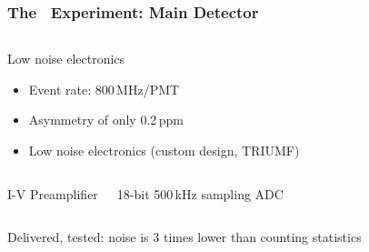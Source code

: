\begin{frame}
 \frametitle{The \Qweak\ Experiment: Main Detector}
 \begin{columns}
   \begin{block}{Low noise electronics}
    \begin{itemize}
     \item Event rate: 800\,MHz/PMT
     \item Asymmetry of only 0.2\,ppm
     \item Low noise electronics (custom design, TRIUMF)
    \end{itemize}
   \end{block}
   \centerline{}
 \end{columns}
 \begin{columns}[T]
   \begin{block}{I-V Preamplifier}
    \centerline{}
   \end{block}
   \begin{block}{18-bit 500\,kHz sampling ADC}
    \centerline{}
   \end{block}
 \end{columns}
 Delivered, tested: noise is \alert{3 times lower than counting statistics}
\end{frame}
